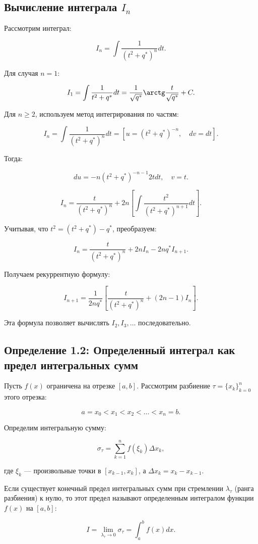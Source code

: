 {\subsection*{Вычисление интеграла \( I_n \)}

Рассмотрим интеграл:

\[
I_n = \int \frac{1}{(t^2 + q^*)^n} dt.
\]

Для случая \( n = 1 \):

\[
I_1 = \int \frac{1}{t^2 + q^*} dt = \frac{1}{\sqrt{q^*}} \arctg \frac{t}{\sqrt{q^*}} + C.
\]

Для \( n \geq 2 \), используем метод интегрирования по частям:

\[
I_n = \int \frac{1}{(t^2 + q^*)^n} dt = \left[ u = (t^2 + q^*)^{-n}, \quad dv = dt \right].
\]

Тогда:

\[
du = -n(t^2 + q^*)^{-n-1} 2t dt, \quad v = t.
\]

\[
I_n = \frac{t}{(t^2 + q^*)^n} + 2n \left[ \int \frac{t^2}{(t^2 + q^*)^{n+1}} dt \right].
\]

Учитывая, что \( t^2 = (t^2 + q^*) - q^* \), преобразуем:

\[
I_n = \frac{t}{(t^2 + q^*)^n} + 2n I_n - 2nq^* I_{n+1}.
\]

Получаем рекуррентную формулу:

\[
I_{n+1} = \frac{1}{2nq^*} \left[ \frac{t}{(t^2 + q^*)^n} + (2n-1) I_n \right].
\]

Эта формула позволяет вычислять \( I_2, I_3, \ldots \) последовательно.

\subsection*{Определение 1.2: Определенный интеграл как предел интегральных сумм}

Пусть \( f(x) \) ограничена на отрезке \( [a, b] \). Рассмотрим разбиение \( \tau = \{x_k\}_{k=0}^{n} \) этого отрезка:

\[
a = x_0 < x_1 < x_2 < \dots < x_n = b.
\]

Определим интегральную сумму:

\[
\sigma_\tau = \sum_{k=1}^{n} f(\xi_k) \Delta x_k,
\]

где \( \xi_k \) — произвольные точки в \( [x_{k-1}, x_k] \), а \( \Delta x_k = x_k - x_{k-1} \).

Если существует конечный предел интегральных сумм при стремлении \( \lambda_\tau \) (ранга разбиения) к нулю, то этот предел называют определенным интегралом функции \( f(x) \) на \( [a, b] \):

\[
I = \lim_{\lambda_\tau \to 0} \sigma_\tau = \int_a^b f(x)dx.
\]

}